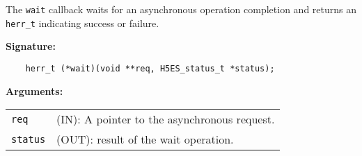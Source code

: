 The {\tt wait} callback waits for an asynchronous operation completion
and returns an {\tt herr\_t} indicating success or failure.

\textbf{Signature:}
\begin{lstlisting}
    herr_t (*wait)(void **req, H5ES_status_t *status);
\end{lstlisting}

\textbf{Arguments:}\\
\begin{tabular}{l p{10cm}}
  {\tt req} & (IN): A pointer to the asynchronous request.\\
  {\tt status} & (OUT): result of the wait operation.\\
\end{tabular}

